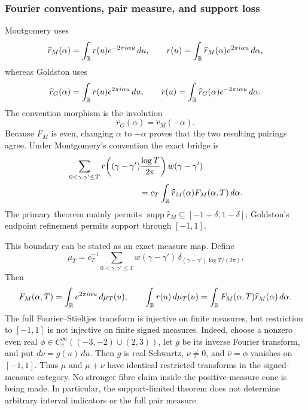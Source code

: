 \subsubsection{Fourier conventions, pair measure, and support loss}

Montgomery uses~\cite[pp.~181--182, eqs.~(3)--(6)]{montgomery1973}
\[
 \widehat r_M(\alpha)=\int_\mathbb R r(u)e^{-2\pi i\alpha u}\,du,
 \qquad
 r(u)=\int_\mathbb R\widehat r_M(\alpha)e^{2\pi i\alpha u}\,d\alpha,
\]
whereas Goldston uses~\cite[Sec.~5]{goldston2004}
\[
 \widehat r_G(\alpha)=\int_\mathbb R r(u)e^{2\pi i\alpha u}\,du,
 \qquad
 r(u)=\int_\mathbb R\widehat r_G(\alpha)e^{-2\pi i\alpha u}\,d\alpha.
\]
The convention morphism is the involution
\begin{equation}
 \widehat r_G(\alpha)=\widehat r_M(-\alpha).
 \label{eq:fourier-sign-reflection}
\end{equation}
Because $F_M$ is even, changing $\alpha$ to $-\alpha$ proves that the two resulting
pairings agree.  Under Montgomery's convention the exact bridge is
\begin{align}
 &\sum_{0<\gamma,\gamma'\leq T}
 r\!\left((\gamma-\gamma')\frac{\log T}{2\pi}\right)w(\gamma-\gamma') \notag\\
 &\hspace{30mm}=c_T
 \int_\R\widehat r_M(\alpha)F_M(\alpha,T)\,d\alpha.
 \label{eq:test-pair-bridge}
\end{align}
The primary theorem mainly permits
$\operatorname{supp}\widehat r_M\subseteq[-1+\delta,1-\delta]$; Goldston's endpoint
refinement permits support through $[-1,1]$.

This boundary can be stated as an exact measure map.  Define
\begin{equation}
 \mu_T=c_T^{-1}\sum_{0<\gamma,\gamma'\leq T}
 w(\gamma-\gamma')\,
 \delta_{(\gamma-\gamma')\log T/(2\pi)}.
 \label{eq:weighted-pair-measure}
\end{equation}
Then
\begin{equation}
 F_M(\alpha,T)=\int_\mathbb R e^{2\pi i\alpha u}\,d\mu_T(u),
 \qquad
 \int_\mathbb R r(u)\,d\mu_T(u)
 =\int_\mathbb R F_M(\alpha,T)\widehat r_M(\alpha)\,d\alpha.
 \label{eq:pair-measure-transform}
\end{equation}
The full Fourier--Stieltjes transform is injective on finite measures, but restriction to
$[-1,1]$ is not injective on finite signed measures.  Indeed, choose a nonzero even real
$\phi\in C_c^\infty((-3,-2)\cup(2,3))$, let $g$ be its inverse Fourier transform, and put
$d\nu=g(u)\,du$.  Then $g$ is real Schwartz, $\nu\neq0$, and
$\widehat\nu=\phi$ vanishes on $[-1,1]$.  Thus $\mu$ and $\mu+\nu$ have identical
restricted transforms in the signed-measure category.  No stronger fibre claim inside the
positive-measure cone is being made.  In particular, the support-limited theorem does not
determine arbitrary interval indicators or the full pair measure.


